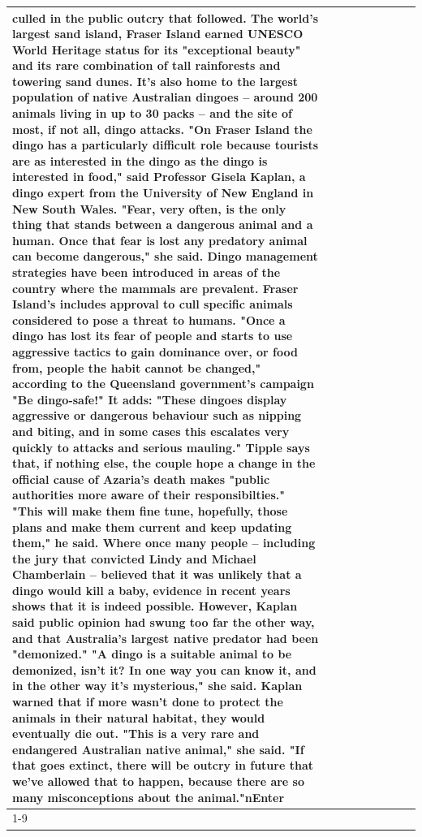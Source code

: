 \begin{table}[H]
\begin{tabular}{lllrlllll}
culled in the public outcry that followed. The world's largest sand island, Fraser Island earned UNESCO World Heritage status for its "exceptional beauty" and its rare combination of tall rainforests and towering sand dunes. It's also home to the largest population of native Australian dingoes -- around 200 animals living in up to 30 packs -- and the site of most, if not all, dingo attacks. "On Fraser Island the dingo has a particularly difficult role because tourists are as interested in the dingo as the dingo is interested in food," said Professor Gisela Kaplan, a dingo expert from the University of New England in New South Wales. "Fear, very often, is the only thing that stands between a dangerous animal and a human. Once that fear is lost any predatory animal can become dangerous," she said. Dingo management strategies have been introduced in areas of the country where the mammals are prevalent. Fraser Island's includes approval to cull specific animals considered to pose a threat to humans. "Once a dingo has lost its fear of people and starts to use aggressive tactics to gain dominance over, or food from, people the habit cannot be changed," according to the Queensland government's campaign "Be dingo-safe!" It adds: "These dingoes display aggressive or dangerous behaviour such as nipping and biting, and in some cases this escalates very quickly to attacks and serious mauling." Tipple says that, if nothing else, the couple hope a change in the official cause of Azaria's death makes "public authorities more aware of their responsibilties." "This will make them fine tune, hopefully, those plans and make them current and keep updating them," he said. Where once many people -- including the jury that convicted Lindy and Michael Chamberlain -- believed that it was unlikely that a dingo would kill a baby, evidence in recent years shows that it is indeed possible. However, Kaplan said public opinion had swung too far the other way, and that Australia's largest native predator had been "demonized." "A dingo is a suitable animal to be demonized, isn't it? In one way you can know it, and in the other way it's mysterious," she said. Kaplan warned that if more wasn't done to protect the animals in their natural habitat, they would eventually die out. "This is a very rare and endangered Australian native animal," she said. "If that goes extinct, there will be outcry in future that we've allowed that to happen, because there are so many misconceptions about the animal."nEnter \\
\cline{1-9}

\end{tabular}
\end{table}
